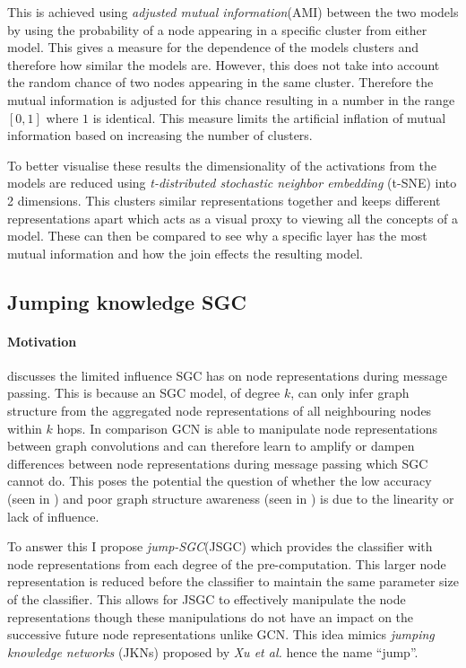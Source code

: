 This is achieved using \emph{adjusted mutual information}(AMI) between the two models by using the probability of a node appearing in a specific cluster from either model.
This gives a measure for the dependence of the models clusters and therefore how similar the models are.
However, this does not take into account the random chance of two nodes appearing in the same cluster.
Therefore the mutual information is adjusted for this chance resulting in a number in the range $[0, 1]$ where $1$ is identical.
This measure limits the artificial inflation of mutual information based on increasing the number of clusters.

To better visualise these results the dimensionality of the activations from the models are reduced using \emph{t-distributed stochastic neighbor embedding} (t-SNE) into 2 dimensions.
This clusters similar representations together and keeps different representations apart which acts as a visual proxy to viewing all the concepts of a model.
These can then be compared to see why a specific layer has the most mutual information and how the join effects the resulting model.

\subsection{Jumping knowledge SGC}
\paragraph{Motivation}
 discusses the limited influence SGC has on node representations during message passing.
This is because an SGC model, of degree $k$, can only infer graph structure from the aggregated node representations of all neighbouring nodes within $k$ hops.
In comparison GCN is able to manipulate node representations between graph convolutions and can therefore learn to amplify or dampen differences between node representations during message passing which SGC cannot do.
This poses the potential the question of whether the low accuracy (seen in ) and poor graph structure awareness (seen in ) is due to the linearity or lack of influence.

To answer this I propose \emph{jump-SGC}(JSGC) which provides the classifier with node representations from each degree of the pre-computation.
This larger node representation is reduced before the classifier to maintain the same parameter size of the classifier.
This allows for JSGC to effectively manipulate the node representations though these manipulations do not have an impact on the successive future node representations unlike GCN.
This idea mimics \emph{jumping knowledge networks} (JKNs) proposed by \textit{Xu et al.}\cite{xu2018representation} hence the name ``jump''.

